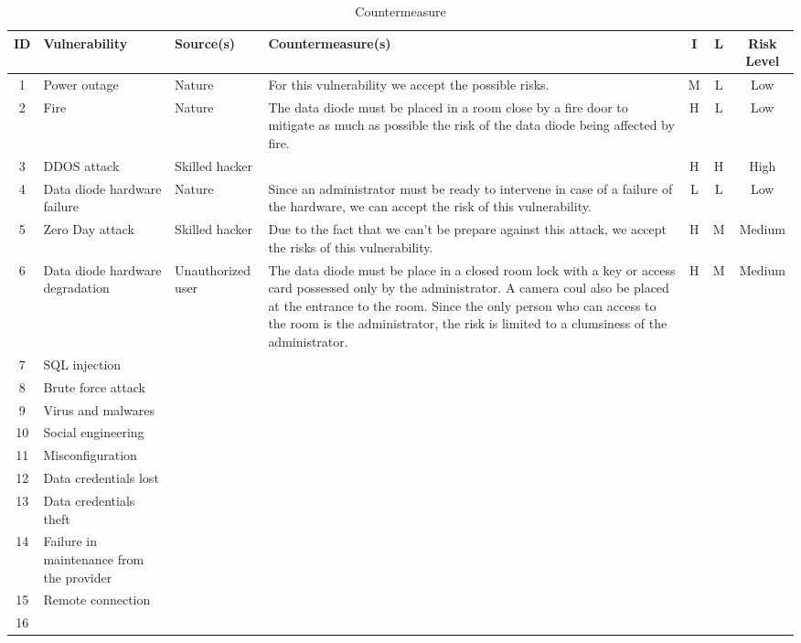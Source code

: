 \documentclass[a4paper,10pt]{article}
\begin{document}
\begin{table}[!h]
	\centering
	\begin{tabular}{|c|p{}|p{2.5cm}|p{6.5cm}|c|c|c|}
		\hline
		\textbf{ID}& \textbf{Vulnerability} & \textbf{Source(s)} & \textbf{Countermeasure(s)} & \textbf{I} & \textbf{L} & \textbf{Risk Level}          \\
		\hline
		1 & Power outage  & Nature & For this vulnerability we accept the possible risks. & M & L & Low \\
		\hline
		2 & Fire & Nature & The data diode must be placed in a room close by a fire door to mitigate as much as possible the risk of the data diode being affected by fire. & H & L & Low \\
		\hline
		3 & DDOS attack & Skilled hacker & & H & H & High \\
		\hline
		4 & Data diode hardware failure & Nature & Since an administrator must be ready to intervene in case of a failure of the hardware, we can accept the risk of this vulnerability. & L & L & Low \\
		\hline
		5 & Zero Day attack & Skilled hacker & Due to the fact that we can't be prepare against this attack, we accept the risks of this vulnerability. & H & M & Medium \\
		\hline
		6 & Data diode hardware degradation & Unauthorized user & The data diode must be place in a closed room lock with a key or access card possessed only by the administrator. A camera coul also be placed at the entrance to the room. Since the only person who can access to the room is the administrator, the risk is limited to a clumsiness of the administrator. & H & M & Medium  \\
		\hline
		7 &  SQL injection & & & & & \\
		\hline
		8 & Brute force attack & & & & & \\
		\hline
		9 & Virus and malwares & & & & & \\
		\hline
		10 & Social engineering & & & & & \\
		\hline
		11 & Misconfiguration & & & & & \\
		\hline
		12 & Data credentials lost & & & & & \\
		\hline
		13 &  Data credentials theft& & & & & \\
		\hline
		14 & Failure in maintenance from the provider& & & & & \\
		\hline
		15 & Remote connection & & & & & \\
		\hline
		16 & & & & & & \\
		\hline
		
	\end{tabular}
	\caption{Countermeasure}
\end{table}
\end{document}
